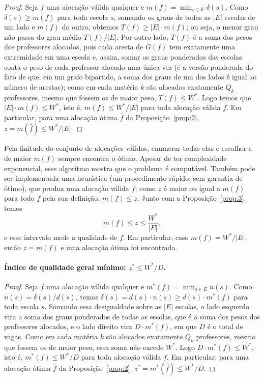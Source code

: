 \documentclass[12pt,a4paper]{article}
\begin{document}
\begin{proof}
Seja $f$ uma alocação válida qualquer e $m(f) = \min_{s \in E} \delta(s)$. Como $\delta(s) \ge m(f)$ para toda escola $s$, somando os graus de todas as $|E|$ escolas de um lado e $m(f)$ do outro, obtemos $T(f) \ge |E| \cdot m(f)$; ou seja, o menor grau não passa do grau médio $T(f)/|E|$. Por outro lado, $T(f)$ é a soma dos pesos dos professores alocados, pois cada aresta de $G(f)$ tem exatamente uma extremidade em uma escola e, assim, somar os graus ponderados das escolas conta o peso de cada professor alocado uma única vez (é a versão ponderada do fato de que, em um grafo bipartido, a soma dos graus de um dos lados é igual ao número de arestas); como em cada matéria $k$ são alocados exatamente $Q_k$ professores, mesmo que fossem os de maior peso, $T(f) \le W^*$. Logo temos que $|E| \cdot m(f) \le W^*$, isto é, $m(f) \le W^*/|E|$ para toda alocação válida $f$. Em particular, para uma alocação ótima $\hat{f}$ da Proposição~\ref{prop:2}, $z = m(\hat{f}) \le W^*/|E|$.
\end{proof}

Pela finitude do conjunto de alocações válidas, enumerar todas elas e escolher a de maior $m(f)$ sempre encontra o ótimo. Apesar de ter complexidade exponencial, esse algoritmo mostra que o problema é computável. Também pode ser implementada uma heurística (um procedimento rápido, sem garantia de ótimo), que produz uma alocação válida $f$; como $z$ é maior ou igual a $m(f)$ para todo $f$ pela sua definição, $m(f) \le z$. Junto com a Proposição~\ref{prop:3}, temos
\[
  m(f) \le z \le \frac{W^*}{|E|},
\]
e esse intervalo mede a qualidade de $f$. Em particular, caso $m(f) = W^*/|E|$, então $z = m(f)$ e uma alocação ótima foi encontrada.

\paragraph{Índice de qualidade geral mínimo: $z^* \le W^*/D$.}

\begin{proof}
Seja $f$ uma alocação válida qualquer e $m^*(f) = \min_{s \in E} n(s)$. Como $n(s) = \delta(s)/d(s)$, temos $\delta(s) = d(s) \cdot n(s) \ge d(s) \cdot m^*(f)$ para toda escola $s$. Somando essa desigualdade sobre as $|E|$ escolas, o lado esquerdo vira a soma dos graus ponderados de todas as escolas, que é a soma dos pesos dos professores alocados, e o lado direito vira $D \cdot m^*(f)$, em que $D$ é o total de vagas. Como em cada matéria $k$ são alocados exatamente $Q_k$ professores, mesmo que fossem os de maior peso, essa soma não excede $W^*$. Logo $D \cdot m^*(f) \le W^*$, isto é, $m^*(f) \le W^*/D$ para toda alocação válida $f$. Em particular, para uma alocação ótima $\hat{f}$ da Proposição~\ref{prop:2}, $z^* = m^*(\hat{f}) \le W^*/D$.
\end{proof}
\end{document}
